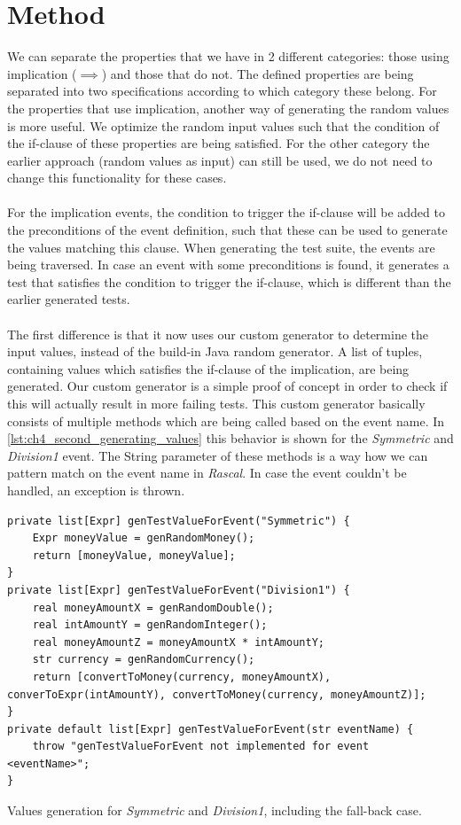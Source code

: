 \section{Method}
We can separate the properties that we have in 2 different categories: those using implication ($\implies$) and those that do not. The defined properties are being separated into two specifications according to which category these belong. For the properties that use implication, another way of generating the random values is more useful. We optimize the random input values such that the condition of the if-clause of these properties are being satisfied. For the other category the earlier approach (random values as input) can still be used, we do not need to change this functionality for these cases.\\
\\
For the implication events, the condition to trigger the if-clause will be added to the preconditions of the event definition, such that these can be used to generate the values matching this clause. When generating the test suite, the events are being traversed. In case an event with some preconditions is found, it generates a test that satisfies the condition to trigger the if-clause, which is different than the earlier generated tests.\\
\\
The first difference is that it now uses our custom generator to determine the input values, instead of the build-in Java random generator. A list of tuples, containing values which satisfies the if-clause of the implication, are being generated. Our custom generator is a simple proof of concept in order to check if this will actually result in more failing tests. This custom generator basically consists of multiple methods which are being called based on the event name. In \autoref{lst:ch4_second_generating_values} this behavior is shown for the \textit{Symmetric} and \textit{Division1} event. The String parameter of these methods is a way how we can pattern match on the event name in \textit{Rascal}. In case the event couldn't be handled, an exception is thrown.
\FloatBarrier
\begin{sourcecode}[!ht]
\begin{lstlisting}[language=Rascal]
private list[Expr] genTestValueForEvent("Symmetric") {
    Expr moneyValue = genRandomMoney();
    return [moneyValue, moneyValue];
}
private list[Expr] genTestValueForEvent("Division1") {
    real moneyAmountX = genRandomDouble();
    real intAmountY = genRandomInteger();
    real moneyAmountZ = moneyAmountX * intAmountY;
    str currency = genRandomCurrency();
    return [convertToMoney(currency, moneyAmountX), converToExpr(intAmountY), convertToMoney(currency, moneyAmountZ)];
}
private default list[Expr] genTestValueForEvent(str eventName) {
    throw "genTestValueForEvent not implemented for event <eventName>";
}
\end{lstlisting}
\caption{Values generation for \textit{Symmetric} and \textit{Division1}, including the fall-back case.}
\label{lst:ch4_second_generating_values}
\end{sourcecode}
